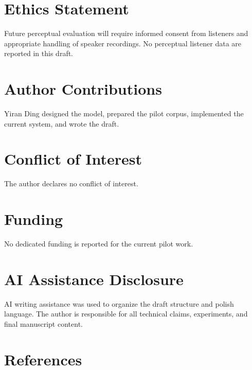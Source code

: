 \section{Ethics Statement}\label{ethics-statement}

Future perceptual evaluation will require informed consent from
listeners and appropriate handling of speaker recordings. No perceptual
listener data are reported in this draft.

\section{Author Contributions}\label{author-contributions}

Yiran Ding designed the model, prepared the pilot corpus, implemented
the current system, and wrote the draft.

\section{Conflict of Interest}\label{conflict-of-interest}

The author declares no conflict of interest.

\section{Funding}\label{funding}

No dedicated funding is reported for the current pilot work.

\section{AI Assistance Disclosure}\label{ai-assistance-disclosure}

AI writing assistance was used to organize the draft structure and
polish language. The author is responsible for all technical claims,
experiments, and final manuscript content.

\section*{References}\label{references}

